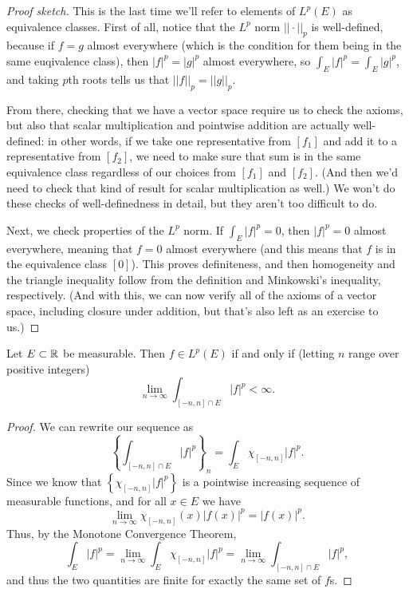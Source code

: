 \begin{proof}[Proof sketch]
This is the last time we'll refer to elements of $L^p(E)$ as equivalence classes. First of all, notice that the $L^p$ norm $||\cdot||_p$ is well-defined, because if $f = g$ almost everywhere (which is the condition for them being in the same euqivalence class), then $|f|^p = |g|^p$ almost everywhere, so $\int_E |f|^p = \int_E |g|^p$, and taking $p$th roots tells us that $||f||_p = ||g||_p$.

From there, checking that we have a vector space require us to check the axioms, but also that scalar multiplication and pointwise addition are actually well-defined: in other words, if we take one representative from $[f_1]$ and add it to a representative from $[f_2]$, we need to make sure that sum is in the same equivalence class regardless of our choices from $[f_1]$ and $[f_2]$. (And then we'd need to check that kind of result for scalar multiplication as well.) We won't do these checks of well-definedness in detail, but they aren't too difficult to do.

Next, we check properties of the $L^p$ norm. If $\int_E |f|^p = 0$, then $|f|^p = 0$ almost everywhere, meaning that $f = 0$ almost everywhere (and this means that $f$ is in the equivalence class $[0]$). This proves definiteness, and then homogeneity and the triangle inequality follow from the definition and Minkowski's inequality, respectively. (And with this, we can now verify all of the axioms of a vector space, including closure under addition, but that's also left as an exercise to us.)
\end{proof}

\begin{proposition}
Let $E \subset \mathbb R$ be measurable. Then $f \in L^p(E)$ if and only if (letting $n$ range over positive integers)
\[
    \lim_{n \to \infty} \int_{[-n, n] \cap E} |f|^p < \infty.
\]
\end{proposition}
\begin{proof}
We can rewrite our sequence as
\[
    \left\{\int_{[-n, n] \cap E} |f|^p\right\}_n = \int_E \chi_{[-n, n]} |f|^p.
\]
Since we know that $\left\{\chi_{[-n, n]} |f|^p\right\}$ is a pointwise increasing sequence of measurable functions, and for all $x \in E$ we have
\[
    \lim_{n \to \infty} \chi_{[-n, n]}(x) |f(x)|^p = |f(x)|^p.
\]
Thus, by the Monotone Convergence Theorem, 
\[
    \int_E |f|^p = \lim_{n \to \infty} \int_E \chi_{[-n, n]} |f|^p =  \lim_{n \to \infty} \int_{[-n, n] \cap E} |f|^p,
\]
and thus the two quantities are finite for exactly the same set of $f$s. 
\end{proof}

